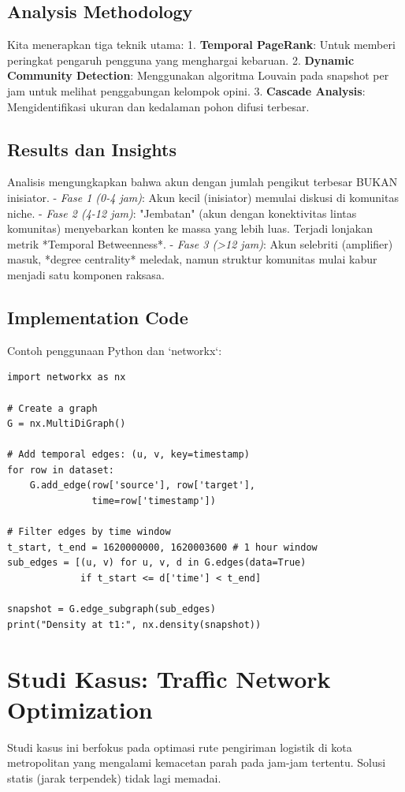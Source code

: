 \documentclass[12pt,a4paper]{book}
\begin{document}
\section{Analysis Methodology}
Kita menerapkan tiga teknik utama:
1.  \textbf{Temporal PageRank}: Untuk memberi peringkat pengaruh pengguna yang menghargai kebaruan.
2.  \textbf{Dynamic Community Detection}: Menggunakan algoritma Louvain pada snapshot per jam untuk melihat penggabungan kelompok opini.
3.  \textbf{Cascade Analysis}: Mengidentifikasi ukuran dan kedalaman pohon difusi terbesar.

\section{Results dan Insights}
Analisis mengungkapkan bahwa akun dengan jumlah pengikut terbesar BUKAN inisiator.
- \textit{Fase 1 (0-4 jam)}: Akun kecil (inisiator) memulai diskusi di komunitas niche.
- \textit{Fase 2 (4-12 jam)}: "Jembatan" (akun dengan konektivitas lintas komunitas) menyebarkan konten ke massa yang lebih luas. Terjadi lonjakan metrik *Temporal Betweenness*.
- \textit{Fase 3 (>12 jam)}: Akun selebriti (amplifier) masuk, *degree centrality* meledak, namun struktur komunitas mulai kabur menjadi satu komponen raksasa.

\section{Implementation Code}
Contoh penggunaan Python dan `networkx`:
\begin{verbatim}
import networkx as nx

# Create a graph
G = nx.MultiDiGraph()

# Add temporal edges: (u, v, key=timestamp)
for row in dataset:
    G.add_edge(row['source'], row['target'], 
               time=row['timestamp'])

# Filter edges by time window
t_start, t_end = 1620000000, 1620003600 # 1 hour window
sub_edges = [(u, v) for u, v, d in G.edges(data=True) 
             if t_start <= d['time'] < t_end]
             
snapshot = G.edge_subgraph(sub_edges)
print("Density at t1:", nx.density(snapshot))
\end{verbatim}

\chapter{Studi Kasus: Traffic Network Optimization}
Studi kasus ini berfokus pada optimasi rute pengiriman logistik di kota metropolitan yang mengalami kemacetan parah pada jam-jam tertentu. Solusi statis (jarak terpendek) tidak lagi memadai.
\end{document}
